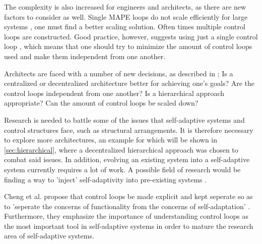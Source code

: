     \quad The complexity is also increased for engineers and architects, as there are new factors to consider as well.
    Single MAPE loops do not scale efficiently for large systems \cite[p. 174]{cardellini}, one must find a better scaling solution. Often times multiple control loops are constructed.
    Good practice, however, suggests using just a single control loop \cite{accidents}, which means that one should try to minimize the amount of control loops used and
    make them independent from one another.
    
    
    \quad Architects are faced with a number of new decisions, as described in \cite[p. 14]{Cheng:2009:SES:1573856.1573858};
    Is a centralized or decentralized architecture better for achieving one's goals? Are the control loops independent from one another?
    Is a hierarchical approach appropriate? Can the amount of control loops be scaled down?
    
    \quad Research is needed to battle some of the issues that self-adaptive systems and control structures face, such as structural arrangements. 
    It is therefore necessary to explore more architectures, an example for which will be shown in \ref{sec:hierarchical}, where a decentralized hierarchical approach was
    chosen to combat said issues. In addition, evolving an existing system into a self-adaptive system currently requires a lot of work. 
    A possible field of research would be finding a way to 'inject' self-adaptivity into pre-existing systems \cite[p. 18]{Cheng:2009:SES:1573856.1573858}.
    
    \quad Cheng et al. propose that control loops be made explicit and kept seperate so as to 'seperate the concerns of functionality from the concerns of self-adaptation' \cite[p. 16]{Cheng:2009:SES:1573856.1573858}.
    Furthermore, they emphasize the importance of understanding control loops as the most important tool in self-adaptive systems in order to mature the research area of self-adaptive systems.
    
